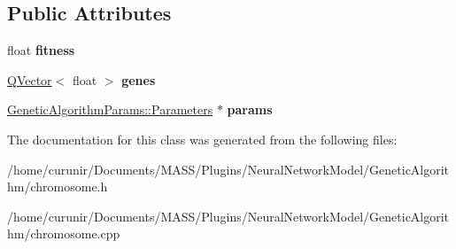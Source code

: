 \subsection*{Public Attributes}
\begin{DoxyCompactItemize}
\item 
float {\bfseries fitness}\hypertarget{class_chromosome_af1e2825bfa9ca01f83610d68d7773238}{}\label{class_chromosome_af1e2825bfa9ca01f83610d68d7773238}

\item 
\hyperlink{class_q_vector}{Q\+Vector}$<$ float $>$ {\bfseries genes}\hypertarget{class_chromosome_a9802175d2f1b9e093e2cbd93fdd22de7}{}\label{class_chromosome_a9802175d2f1b9e093e2cbd93fdd22de7}

\item 
\hyperlink{struct_genetic_algorithm_params_1_1_parameters}{Genetic\+Algorithm\+Params\+::\+Parameters} $\ast$ {\bfseries params}\hypertarget{class_chromosome_a3e23041223b3fdcf0758f67c41b8d346}{}\label{class_chromosome_a3e23041223b3fdcf0758f67c41b8d346}

\end{DoxyCompactItemize}


The documentation for this class was generated from the following files\+:\begin{DoxyCompactItemize}
\item 
/home/curunir/\+Documents/\+M\+A\+S\+S/\+Plugins/\+Neural\+Network\+Model/\+Genetic\+Algorithm/chromosome.\+h\item 
/home/curunir/\+Documents/\+M\+A\+S\+S/\+Plugins/\+Neural\+Network\+Model/\+Genetic\+Algorithm/chromosome.\+cpp\end{DoxyCompactItemize}
